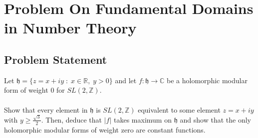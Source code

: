 

\pagebreak
\section{Problem On Fundamental Domains in Number Theory}
\subsection{Problem Statement}
Let $\mathfrak{h} = \{z = x + iy\;:\; x \in \mathbb{R},\;y > 0\}$ and let $f : \mathfrak{h} \to \mathbb{C}$ be a holomorphic modular form of weight $0$ for $SL(2,\mathbb{Z})$.\\
\\
Show that every element in $\mathfrak{h}$ is $SL(2,\mathbb{Z})$ equivalent to some element $z = x + iy$ with $y \geq \frac{\sqrt{3}}{2}$. Then, deduce that $|f|$ takes maximum on $\mathfrak{h}$ and show that the only holomorphic modular forms of weight zero are constant functions.
